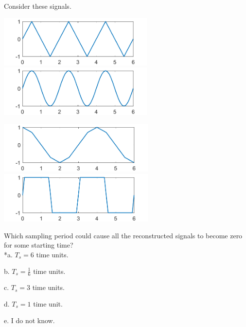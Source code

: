 
Consider these signals.

\includegraphics[width=3.05818in,height=1.01323in]{../../Images/SamplingAndAliasingQ3I.png}
\includegraphics[width=3.06183in,height=1.01444in]{../../Images/SamplingAndAliasingQ3II.png}

\includegraphics[width=3.08072in,height=1.02069in]{../../Images/SamplingAndAliasingQ3III.png}
\includegraphics[width=3.08538in,height=1.02224in]{../../Images/SamplingAndAliasingQ3IV.png}

Which sampling period could cause all the reconstructed signals to become zero for some starting time? \\

*a. \(T_{s} = 6\) time units.


b. \(T_{s} = \frac{1}{6}\) time units.


c. \(T_{s} = 3\) time units.


d. \(T_{s} = 1\) time unit.


e. I do not know. \\

